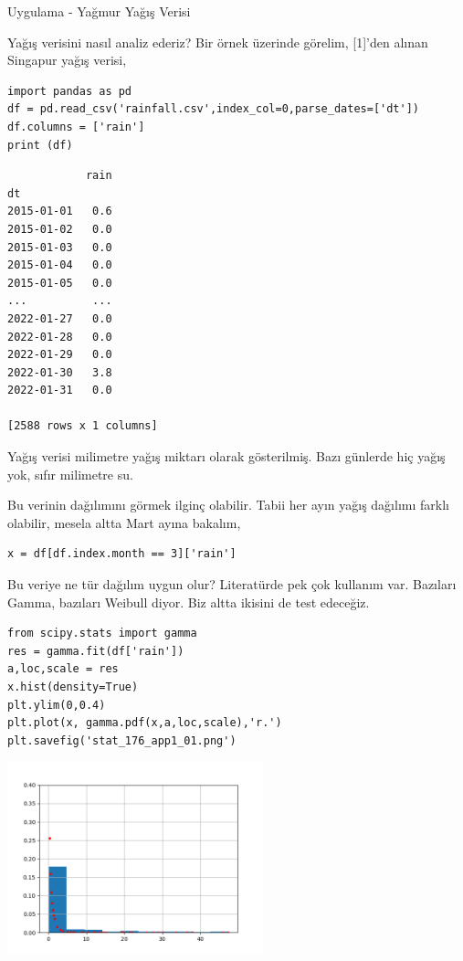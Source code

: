 \documentclass[12pt,fleqn]{article}\usepackage{../../common}
\begin{document}
Uygulama - Yağmur Yağış Verisi

Yağış verisini nasıl analiz ederiz? Bir örnek üzerinde görelim, [1]'den alınan
Singapur yağış verisi,

\begin{verbatim}
import pandas as pd
df = pd.read_csv('rainfall.csv',index_col=0,parse_dates=['dt'])
df.columns = ['rain']
print (df)
\end{verbatim}

\begin{verbatim}
            rain
dt              
2015-01-01   0.6
2015-01-02   0.0
2015-01-03   0.0
2015-01-04   0.0
2015-01-05   0.0
...          ...
2022-01-27   0.0
2022-01-28   0.0
2022-01-29   0.0
2022-01-30   3.8
2022-01-31   0.0

[2588 rows x 1 columns]
\end{verbatim}

Yağış verisi milimetre yağış miktarı olarak gösterilmiş. Bazı günlerde hiç yağış
yok, sıfır milimetre su.

Bu verinin dağılımını görmek ilginç olabilir. Tabii her ayın yağış dağılımı
farklı olabilir, mesela altta Mart ayına bakalım,

\begin{verbatim}
x = df[df.index.month == 3]['rain']
\end{verbatim}

Bu veriye ne tür dağılım uygun olur? Literatürde pek çok kullanım var.  Bazıları
Gamma, bazıları Weibull diyor. Biz altta ikisini de test edeceğiz.

\begin{verbatim}
from scipy.stats import gamma
res = gamma.fit(df['rain'])
a,loc,scale = res  
x.hist(density=True)
plt.ylim(0,0.4)
plt.plot(x, gamma.pdf(x,a,loc,scale),'r.')
plt.savefig('stat_176_app1_01.png')
\end{verbatim}

\includegraphics[width=20em]{stat_176_app1_01.png}
\end{document}
